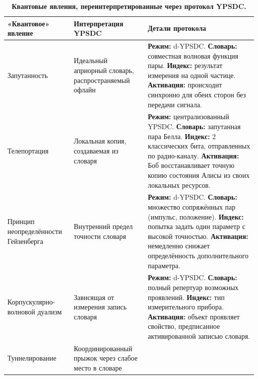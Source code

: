 \documentclass[12pt,a4paper]{article}
\theoremstyle{remark}
\begin{document}
	\begin{table}[htbp]
		\centering
		\caption{\normalsize\textbf{Квантовые явления, переинтерпретированные через протокол YPSDC.}}
		\label{tab:quantum-ypsdc}
		\small
		\begin{tabular}{p{2.8cm} p{4.8cm} p{7.8cm}}
			\toprule
			\textbf{«Квантовое» явление} &
			\textbf{Интерпретация YPSDC} &
			\textbf{Детали протокола} \\
			\midrule
			Запутанность &
			Идеальный априорный словарь, распространяемый офлайн &
			\textbf{Режим:} d-YPSDC. \newline
			\textbf{Словарь:} совместная волновая функция пары. \newline
			\textbf{Индекс:} результат измерения на одной частице. \newline
			\textbf{Активация:} происходит синхронно для обеих сторон без передачи сигнала. \\
			\midrule
			Телепортация &
			Локальная копия, создаваемая из словаря &
			\textbf{Режим:} централизованный YPSDC. \newline
			\textbf{Словарь:} запутанная пара Белла. \newline
			\textbf{Индекс:} 2 классических бита, отправленных по радио-каналу. \newline
			\textbf{Активация:} Боб восстанавливает точную копию состояния Алисы из своих локальных ресурсов. \\
			\midrule
			Принцип неопределённости Гейзенберга &
			Внутренний предел точности словаря &
			\textbf{Режим:} d-YPSDC. \newline
			\textbf{Словарь:} множество сопряжённых пар (импульс, положение). \newline
			\textbf{Индекс:} попытка задать один параметр с высокой точностью. \newline
			\textbf{Активация:} немедленно снижает определённость дополнительного параметра. \\
			\midrule
			Корпускулярно-волновой дуализм &
			Зависящая от измерения запись словаря &
			\textbf{Режим:} d-YPSDC. \newline
			\textbf{Словарь:} полный репертуар возможных проявлений. \newline
			\textbf{Индекс:} тип измерительного прибора. \newline
			\textbf{Активация:} объект проявляет свойство, предписанное активированной записью словаря. \\
			\midrule
			Туннелирование &
			Координированный прыжок через слабое место в словаре &

\end{tabular}
\end{table}
\end{document}
